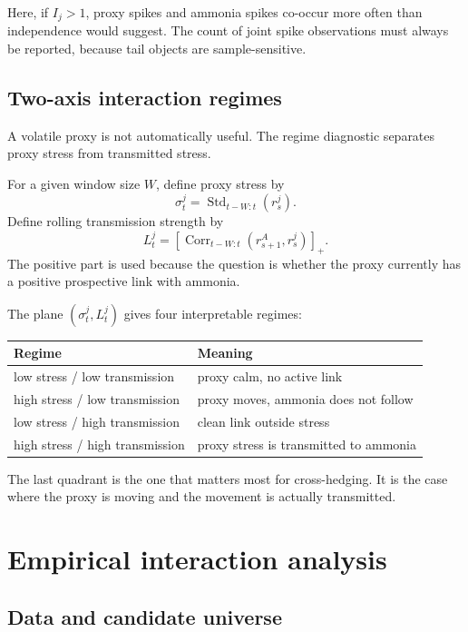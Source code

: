 \documentclass[11pt]{article}
\newcommand{\Corr}{\operatorname{Corr}}
\newcommand{\Std}{\operatorname{Std}}
\newcommand{\1}{\mathbf 1}
\begin{document}
Here, if $I_j > 1$, proxy spikes and ammonia spikes co-occur more often than independence would suggest. The count of joint spike observations must always be reported, because tail objects are sample-sensitive.
\subsection{Two-axis interaction regimes}

A volatile proxy is not automatically useful. The regime diagnostic separates proxy stress from transmitted stress.

For a given window size $W$, define proxy stress by
\[
\sigma^j_t
=
\Std_{t-W:t}(r^j_s).
\]
Define rolling transmission strength by
\[
L^j_t
=
\left[
\Corr_{t-W:t}(r^A_{s+1},r^j_s)
\right]_+ .
\]
The positive part is used because the question is whether the proxy currently has a positive prospective link with ammonia.

The plane \((\sigma^j_t,L^j_t)\) gives four interpretable regimes:
\begin{center}
\renewcommand{\arraystretch}{1.15}
\begin{tabularx}{0.92\textwidth}{lX}
\toprule
Regime & Meaning \\
\midrule
low stress / low transmission & proxy calm, no active link \\
high stress / low transmission & proxy moves, ammonia does not follow \\
low stress / high transmission & clean link outside stress \\
high stress / high transmission & proxy stress is transmitted to ammonia \\
\bottomrule
\end{tabularx}
\end{center}

The last quadrant is the one that matters most for cross-hedging. It is the case where the proxy is moving and the movement is actually transmitted.

\section{Empirical interaction analysis}

\subsection{Data and candidate universe}
\end{document}
